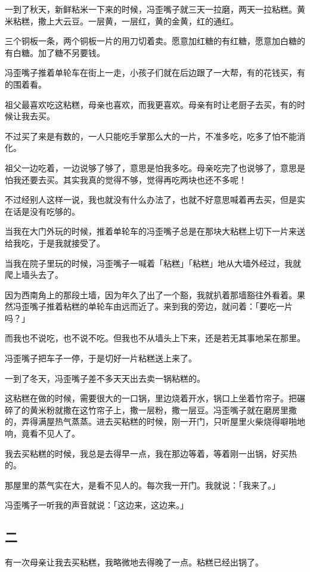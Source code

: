 \documentclass[UTF8]{ctexart}
\begin{document}
一到了秋天，新鲜粘米一下来的时候，冯歪嘴子就三天一拉磨，两天一拉粘糕。黄米粘糕，撒上大云豆。一层黄，一层红，黄的金黄，红的通红。

三个铜板一条，两个铜板一片的用刀切着卖。愿意加红糖的有红糖，愿意加白糖的有白糖。加了糖不另要钱。

冯歪嘴子推着单轮车在街上一走，小孩子们就在后边跟了一大帮，有的花钱买，有的围着看。

祖父最喜欢吃这粘糕，母亲也喜欢，而我更喜欢。母亲有时让老厨子去买，有的时候让我去买。

不过买了来是有数的，一人只能吃手掌那么大的一片，不准多吃，吃多了怕不能消化。

祖父一边吃着，一边说够了够了，意思是怕我多吃。母亲吃完了也说够了，意思是怕我还要去买。其实我真的觉得不够，觉得再吃两块也还不多呢！

不过经别人这样一说，我也就没有什么办法了，也就不好意思喊着再去买，但是实在话是没有吃够的。

当我在大门外玩的时候，推着单轮车的冯歪嘴子总是在那块大粘糕上切下一片来送给我吃，于是我就接受了。

当我在院子里玩的时候，冯歪嘴子一喊着「粘糕」「粘糕」地从大墙外经过，我就爬上墙头去了。

因为西南角上的那段土墙，因为年久了出了一个豁，我就扒着那墙豁往外看着。果然冯歪嘴子推着粘糕的单轮车由远而近了。来到我的旁边，就问着：「要吃一片吗？」

而我也不说吃，也不说不吃。但我也不从墙头上下来，还是若无其事地呆在那里。

冯歪嘴子把车子一停，于是切好一片粘糕送上来了。

一到了冬天，冯歪嘴子差不多天天出去卖一锅粘糕的。

这粘糕在做的时候，需要很大的一口锅，里边烧着开水，锅口上坐着竹帘子。把碾碎了的黄米粉就撒在这竹帘子上，撒一层粉，撒一层豆。冯歪嘴子就在磨房里撒的，弄得满屋热气蒸蒸。进去买粘糕的时候，刚一开门，只听屋里火柴烧得噼啪地响，竟看不见人了。

我去买粘糕的时候，我总是去得早一点，我在那边等着，等着刚一出锅，好买热的。

那屋里的蒸气实在大，是看不见人的。每次我一开门。我就说：「我来了。」

冯歪嘴子一听我的声音就说：「这边来，这边来。」

\subsection{二}

有一次母亲让我去买粘糕，我略微地去得晚了一点。粘糕已经出锅了。
\end{document}
